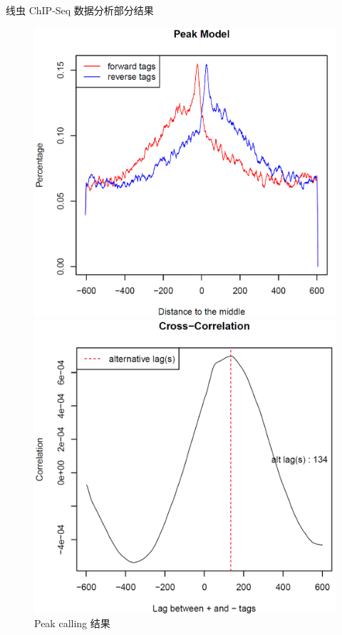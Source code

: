 \documentclass{beamer}
\begin{document}
\begin{frame}{线虫 ChIP-Seq 数据分析}{部分结果}
	\begin{figure}[h]
		\begin{minipage}{0.45\linewidth}
			\centerline{\includegraphics[width=\textwidth]{img/peak_model.png}}
		\end{minipage}
		\begin{minipage}{0.45\linewidth}
			\centerline{\includegraphics[width=\textwidth]{img/cross_correlation.png}}
	\end{minipage}
	
	\caption{Peak calling 结果}
	\end{figure}
\end{frame}
\end{document}
